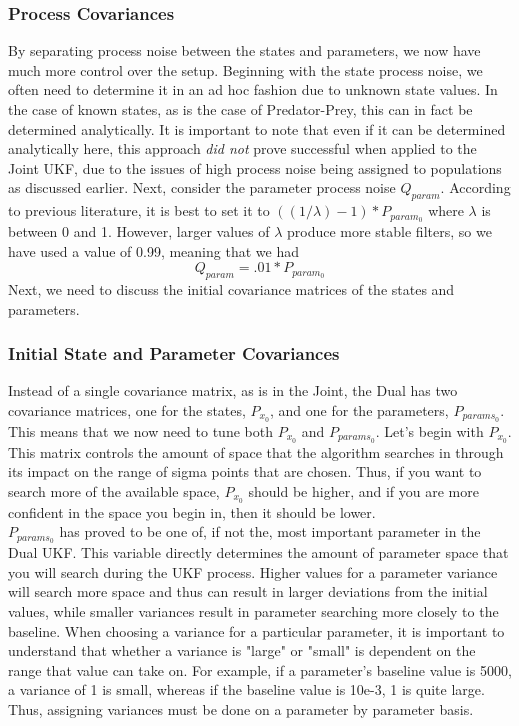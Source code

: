 \subsubsection{Process Covariances}
By separating process noise between the states and parameters, we now have much more control over the setup. Beginning with the state process noise, we often need to determine it in an ad hoc fashion due to unknown state values. In the case of known states, as is the case of Predator-Prey, this can in fact be determined analytically. It is important to note that even if it can be determined analytically here, this approach \emph{did not} prove successful when applied to the Joint UKF, due to the issues of high process noise being assigned to populations as discussed earlier. Next, consider the parameter process noise $Q_{param}$. According to previous literature, %
it is best to set it to $((1/\lambda) - 1) * P_{param_0}$ where $\lambda$ is between 0 and 1. However, larger values of $\lambda$ produce more stable filters, so we have used a value of 0.99, meaning that we had
$$ Q_{param} = .01 * P_{param_0} $$
 Next, we need to discuss the initial covariance matrices of the states and parameters.

\subsubsection{Initial State and Parameter Covariances}
Instead of a single covariance matrix, as is in the Joint, the Dual has two covariance matrices, one for the states, $P_{x_0}$,  and one for the parameters, $P_{params_0}$. This means that we now need to tune both $P_{x_0}$ and $P_{params_0}$. Let's begin with $P_{x_0}$. This matrix controls the amount of space that the algorithm searches in through its impact on the range of sigma points that are chosen. Thus, if you want to search more of the available space, $P_{x_0}$ should be higher, and if you are more confident in the space you begin in, then it should be lower.
\\
$P_{params_0}$ has proved to be one of, if not the, most important parameter in the Dual UKF. This variable directly determines the amount of parameter space that you will search during the UKF process. Higher values for a parameter variance will search more space and thus can result in larger deviations from the initial values, while smaller variances result in parameter searching more closely to the baseline. When choosing a variance for a particular parameter, it is important to understand that whether a variance is "large" or "small" is dependent on the range that value can take on. For example, if a parameter's baseline value is 5000, a variance of 1 is small, whereas if the baseline value is 10e-3, 1 is quite large. Thus, assigning variances must be done on a parameter by parameter basis. 


